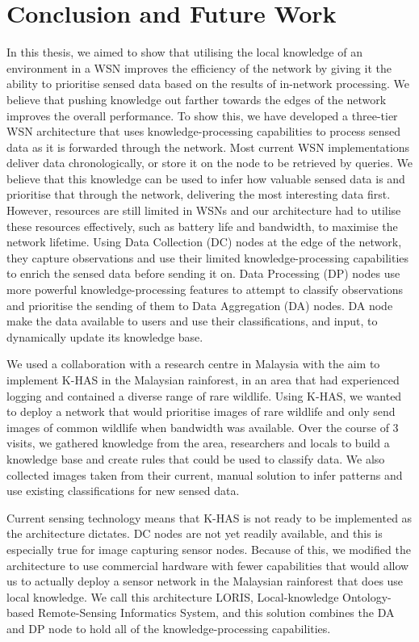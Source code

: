 
\chapter{Conclusion and Future Work}
In this thesis, we aimed to show that utilising the local knowledge of an environment in a WSN improves the efficiency of the network by giving it the ability to prioritise sensed data based on the results of in-network processing.  We believe that pushing knowledge out farther towards the edges of the network improves the overall performance. To show this, we have developed a three-tier WSN architecture that uses knowledge-processing capabilities to process sensed data as it is forwarded through the network. Most current WSN implementations deliver data chronologically, or store it on the node to be retrieved by queries. We believe that this knowledge can be used to infer how valuable sensed data is and prioritise that through the network, delivering the most interesting data first. However, resources are still limited in WSNs and our architecture had to utilise these resources effectively, such as battery life and bandwidth, to maximise the network lifetime. Using Data Collection (DC) nodes at the edge of the network, they capture observations and use their limited knowledge-processing capabilities to enrich the sensed data before sending it on. Data Processing (DP) nodes use more powerful knowledge-processing features to attempt to classify observations and prioritise the sending of them to Data Aggregation (DA) nodes. DA node make the data available to users and use their classifications, and input, to dynamically update its knowledge base.

We used a collaboration with a research centre in Malaysia with the aim to implement K-HAS in the Malaysian rainforest, in an area that had experienced logging and contained a diverse range of rare wildlife. Using K-HAS, we wanted to deploy a network that would prioritise images of rare wildlife and only send images of common wildlife when bandwidth was available.  Over the course of 3 visits, we gathered knowledge from the area, researchers and locals to build a knowledge base and create rules that could be used to classify data. We also collected images taken from their current, manual solution to infer patterns and use existing classifications for new sensed data.

Current sensing technology means that K-HAS is not ready to be implemented as the architecture dictates. DC nodes are not yet readily available, and this is especially true for image capturing sensor nodes. Because of this, we modified the architecture to use commercial hardware with fewer capabilities that would allow us to actually deploy a sensor network in the Malaysian rainforest that does use local knowledge. We call this architecture LORIS, Local-knowledge Ontology-based Remote-Sensing Informatics System, and this solution combines the DA and DP node to hold all of the knowledge-processing capabilities.

